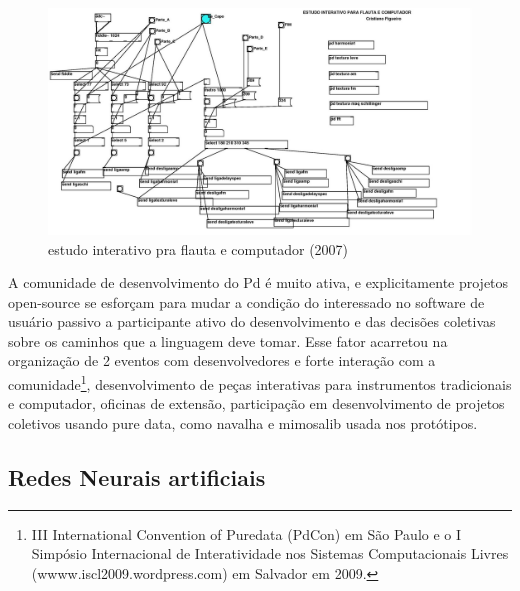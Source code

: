 \documentclass{ppgmus}
\begin{document}
\begin{figure}[!htt]
\includegraphics[scale=.3]{flauta2007}
\caption{estudo interativo pra flauta e computador (2007)}
\label{flauta2007}
\end{figure} 

A comunidade de desenvolvimento do Pd é muito ativa, e explicitamente projetos open-source
se esforçam para mudar a condição do interessado no software de usuário passivo a participante ativo do desenvolvimento
e das decisões coletivas sobre os caminhos que a linguagem deve tomar. Esse  fator acarretou na
organização de 2 eventos com desenvolvedores e forte interação com a comunidade\footnote{III International
Convention of Puredata (PdCon) em São Paulo e o I Simpósio Internacional de Interatividade nos Sistemas
Computacionais Livres (wwww.iscl2009.wordpress.com) em Salvador em 2009.}, desenvolvimento de peças interativas para instrumentos
tradicionais e computador, oficinas de extensão, participação em desenvolvimento de projetos coletivos
usando pure data, como navalha e mimosalib usada nos protótipos.


\subsection{Redes Neurais artificiais}

\end{document}
